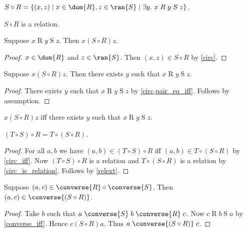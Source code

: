 \begin{definition}\label{circ}
    $S\circ R = \{ (x,z)\mid x\in\dom{R}, z\in\ran{S}\mid \exists y.\  x\mathrel{R}y\mathrel{S}z \}$.
\end{definition}

\begin{proposition}\label{circ_is_relation}
    $S\circ R$ is a relation.
\end{proposition}

\begin{proposition}\label{circ_elem_intro}
    Suppose $x\mathrel{R} y\mathrel{S} z$.
    Then $x\mathrel{(S\circ R)} z$.
\end{proposition}
\begin{proof}
    $x\in\dom{R}$ and $z\in\ran{S}$.
    Then $(x, z)\in S\circ R$ by \cref{circ}.
\end{proof}

\begin{proposition}\label{circ_elem_elim}
    Suppose $x\mathrel{(S\circ R)} z$.
    Then there exists $y$ such that $x\mathrel{R} y\mathrel{S} z$.
\end{proposition}
\begin{proof}
    There exists $y$ such that $x\mathrel{R} y\mathrel{S} z$ by \cref{circ,pair_eq_iff}.
    Follows by assumption.
\end{proof}

\begin{proposition}\label{circ_iff}
    $x\mathrel{(S\circ R)} z$ iff there exists $y$ such that $x\mathrel{R} y\mathrel{S} z$.
\end{proposition}

\begin{proposition}\label{circ_assoc}
    $(T\circ S)\circ R = T\circ (S\circ R)$.
\end{proposition}
\begin{proof}
    For all $a, b$ we have
        $(a,b)\in (T\circ S)\circ R$ iff $(a,b)\in T\circ (S\circ R)$
        by \cref{circ_iff}.
    Now $(T\circ S)\circ R$ is a relation and $T\circ (S\circ R)$ is a relation by
        \cref{circ_is_relation}.
    Follows by \cref{relext}.
\end{proof}

\begin{proposition}\label{circ_converse_intro_tuple}
    Suppose $(a, c) \in\converse{R}\circ\converse{S}$.
    Then $(a,c)\in \converse{(S\circ R)}$.
\end{proposition}
\begin{proof}
    Take $b$ such that $a\mathrel{\converse{S}} b\mathrel{\converse{R}} c$.
    Now $c\mathrel{R}b\mathrel{S} a$ by \cref{converse_iff}.
    Hence $c\mathrel{(S\circ R)} a$.
    Thus $a\mathrel{\converse{(S\circ R)}} c$.
\end{proof}

